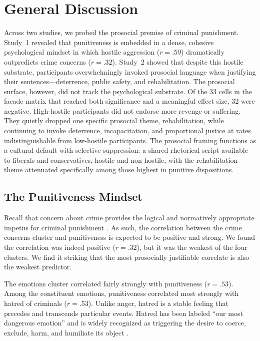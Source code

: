 \section{General Discussion}

Across two studies, we probed the prosocial premise of criminal punishment. Study~1 revealed that punitiveness is embedded in a dense, cohesive psychological mindset in which hostile aggression ($r = .59$) dramatically outpredicts crime concerns ($r = .32$). Study~2 showed that despite this hostile substrate, participants overwhelmingly invoked prosocial language when justifying their sentences---deterrence, public safety, and rehabilitation. The prosocial surface, however, did not track the psychological substrate. Of the 33 cells in the facade matrix that reached both significance and a meaningful effect size, 32 were negative. High-hostile participants did not endorse more revenge or suffering. They quietly dropped one specific prosocial theme, rehabilitation, while continuing to invoke deterrence, incapacitation, and proportional justice at rates indistinguishable from low-hostile participants. The prosocial framing functions as a cultural default with selective suppression: a shared rhetorical script available to liberals and conservatives, hostile and non-hostile, with the rehabilitation theme attenuated specifically among those highest in punitive dispositions.

\subsection{The Punitiveness Mindset}

Recall that concern about crime provides the logical and normatively appropriate impetus for criminal punishment \citep{Enns2016, Pickett2019, Roberts2003}. As such, the correlation between the crime concerns cluster and punitiveness is expected to be positive and strong. We found the correlation was indeed positive ($r = .32$), but it was the weakest of the four clusters. We find it striking that the most prosocially justifiable correlate is also the weakest predictor.

The emotions cluster correlated fairly strongly with punitiveness ($r = .53$). Among the constituent emotions, punitiveness correlated most strongly with hatred of criminals ($r = .53$). Unlike anger, hatred is a stable feeling that precedes and transcends particular events. Hatred has been labeled ``our most dangerous emotion'' \citep{Brogaard2020} and is widely recognized as triggering the desire to coerce, exclude, harm, and humiliate its object \citep{BarTal2007, FischerHalperinCanettiJasini2018}.

